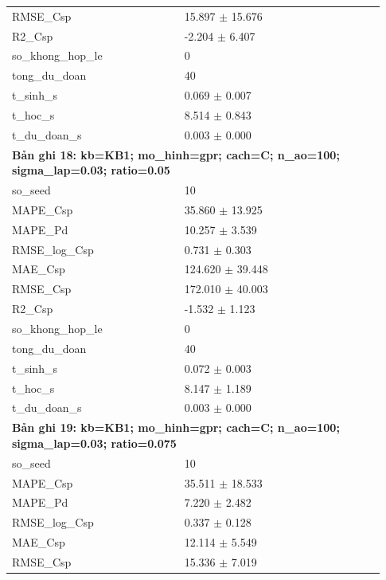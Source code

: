 \begin{longtable}{p{0.43\linewidth}p{0.50\linewidth}}
RMSE\_\allowbreak Csp & 15.897 $\pm$ 15.676 \\
R2\_\allowbreak Csp & -2.204 $\pm$ 6.407 \\
so\_\allowbreak khong\_\allowbreak hop\_\allowbreak le & 0 \\
tong\_\allowbreak du\_\allowbreak doan & 40 \\
t\_\allowbreak sinh\_\allowbreak s & 0.069 $\pm$ 0.007 \\
t\_\allowbreak hoc\_\allowbreak s & 8.514 $\pm$ 0.843 \\
t\_\allowbreak du\_\allowbreak doan\_\allowbreak s & 0.003 $\pm$ 0.000 \\
\midrule
\multicolumn{2}{p{0.95\linewidth}}{\textbf{Bản ghi 18: kb=KB1; mo\_hinh=gpr; cach=C; n\_ao=100; sigma\_lap=0.03; ratio=0.05}} \\
so\_\allowbreak seed & 10 \\
MAPE\_\allowbreak Csp & 35.860 $\pm$ 13.925 \\
MAPE\_\allowbreak Pd & 10.257 $\pm$ 3.539 \\
RMSE\_\allowbreak log\_\allowbreak Csp & 0.731 $\pm$ 0.303 \\
MAE\_\allowbreak Csp & 124.620 $\pm$ 39.448 \\
RMSE\_\allowbreak Csp & 172.010 $\pm$ 40.003 \\
R2\_\allowbreak Csp & -1.532 $\pm$ 1.123 \\
so\_\allowbreak khong\_\allowbreak hop\_\allowbreak le & 0 \\
tong\_\allowbreak du\_\allowbreak doan & 40 \\
t\_\allowbreak sinh\_\allowbreak s & 0.072 $\pm$ 0.003 \\
t\_\allowbreak hoc\_\allowbreak s & 8.147 $\pm$ 1.189 \\
t\_\allowbreak du\_\allowbreak doan\_\allowbreak s & 0.003 $\pm$ 0.000 \\
\midrule
\multicolumn{2}{p{0.95\linewidth}}{\textbf{Bản ghi 19: kb=KB1; mo\_hinh=gpr; cach=C; n\_ao=100; sigma\_lap=0.03; ratio=0.075}} \\
so\_\allowbreak seed & 10 \\
MAPE\_\allowbreak Csp & 35.511 $\pm$ 18.533 \\
MAPE\_\allowbreak Pd & 7.220 $\pm$ 2.482 \\
RMSE\_\allowbreak log\_\allowbreak Csp & 0.337 $\pm$ 0.128 \\
MAE\_\allowbreak Csp & 12.114 $\pm$ 5.549 \\
RMSE\_\allowbreak Csp & 15.336 $\pm$ 7.019 \\

\end{longtable}
